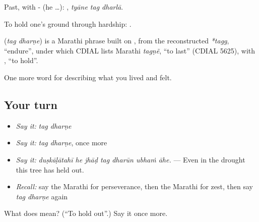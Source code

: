 Past, with - (he …):   , \emph{tyāne tag dharlā}.

To hold one's ground through hardship:   .

\begin{cousinweb}
\textbf{ } (\emph{tag dharṇe}) is a Marathi phrase built on , from the reconstructed \emph{*tagg}, \textquotedblleft{}endure\textquotedblright{}, under which CDIAL lists Marathi \emph{tagṇẽ}, \textquotedblleft{}to last\textquotedblright{} (CDIAL 5625), with , \textquotedblleft{}to hold\textquotedblright{}.
\end{cousinweb}

\begin{grammarlens}[title={What you've built}]
One more word for describing what you lived and felt.
\end{grammarlens}

\subsection*{Your turn}
\begin{itemize}
\raggedright
  \item \emph{Say it:} \emph{tag dharṇe}
  \item \emph{Say it:} \emph{tag dharṇe}, once more
  \item \emph{Say it:} \emph{duṣkāḷātahī he jhāḍ tag dharūn ubhaṁ āhe.} — Even in the drought this tree has held out.
  \item \emph{Recall:} say the Marathi for perseverance, then the Marathi for zest, then say \emph{tag dharṇe} again
\end{itemize}

\begin{tcolorbox}[breakable,colback=teal!4,colframe=teal!35!black,title={Before you move on}]
What does   mean? (\textquotedblleft{}To hold out\textquotedblright{}.) Say it once more.
\end{tcolorbox}
